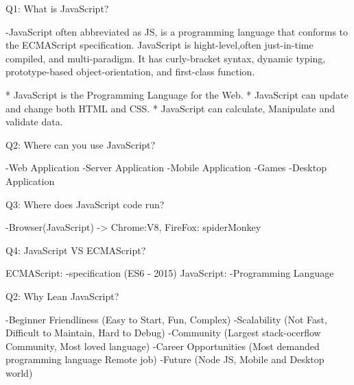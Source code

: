 Q1: What is JavaScript?

    -JavaScript often abbreviated as JS, is a programming language that conforms to the ECMAScript specification. JavaScript is hight-level,often just-in-time compiled, and multi-paradigm. It has curly-bracket syntax, dynamic typing, prototype-based object-orientation, and first-class function.

    * JavaScript is the Programming Language for the Web.
    * JavaScript can update and change both HTML and CSS.
    * JavaScript can calculate, Manipulate and validate  data.


Q2: Where can you use JavaScript?

    -Web Application
    -Server Application
    -Mobile Application
    -Games
    -Desktop Application

Q3: Where does JavaScript code run?

    -Browser(JavaScript) -> Chrome:V8, FireFox: spiderMonkey

Q4: JavaScript VS ECMAScript?

    ECMAScript:
        -specification (ES6 - 2015)
    JavaScript:
        -Programming Language

Q2: Why Lean JavaScript?

    -Beginner Friendliness (Easy to Start, Fun, Complex)
    -Scalability (Not Fast, Difficult to Maintain, Hard to Debug)
    -Community (Largest stack-ocerflow Community, Most loved language)
    -Career Opportunities (Most demanded programming language Remote job)
    -Future (Node JS, Mobile and Desktop world)

